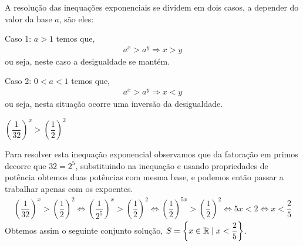 A resolução das inequações exponenciais se dividem em dois casos, a depender do valor da base $a$, são eles:
 
 Caso 1: $a > 1$ temos que,
  \begin{eqnarray*}
 a^{x} > a^y \Rightarrow x>y
 \end{eqnarray*}
 ou seja, neste caso a desigualdade se mantém.

 Caso 2: $0< a < 1$ temos que,
  \begin{eqnarray*}
 a^{x} > a^y \Rightarrow x<y
 \end{eqnarray*}
 ou seja, nesta situação ocorre uma inversão da desigualdade.
 
  \begin{exem}
  $\left( \dfrac{1}{32} \right)^x > \left( \dfrac{1}{2} \right)^2$
  
  Para resolver esta inequação exponencial observamos que da fatoração em primos decorre que $32= 2^5$, substituindo na inequação e usando propriedades de potência obtemos duas potências com mesma base, e podemos então passar a trabalhar apenas com os expoentes.
  \begin{eqnarray*}
  \left( \dfrac{1}{32} \right)^x > \left( \dfrac{1}{2} \right)^2 \Leftrightarrow
  \left( \dfrac{1}{2^5} \right)^x > \left( \dfrac{1}{2} \right)^2 \Leftrightarrow
  \left( \dfrac{1}{2} \right)^{5x} > \left( \dfrac{1}{2} \right)^2 
  \Leftrightarrow 5x < 2 \Leftrightarrow x < \dfrac{2}{5}
  \end{eqnarray*}
  Obtemos assim o seguinte conjunto solução, $S= \left\{ x \in \mathbb{R} \mid x < \dfrac{2}{5} \right\}$.
  \end{exem}
  
  
  
